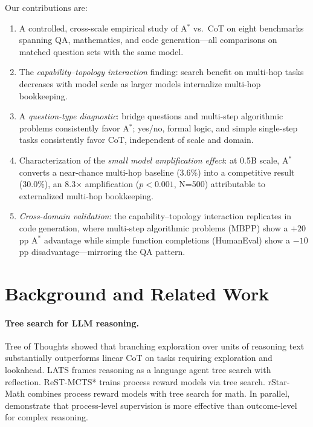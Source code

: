 \documentclass{article}
\newcommand{\astar}{A$^*$\xspace}
\begin{document}
Our contributions are:
\begin{enumerate}[leftmargin=*, noitemsep]
  \item A controlled, cross-scale empirical study of \astar vs.\ CoT on eight benchmarks spanning QA, mathematics, and code generation---all comparisons on matched question sets with the same model.
  \item The \emph{capability--topology interaction} finding: search benefit on multi-hop tasks decreases with model scale as larger models internalize multi-hop bookkeeping.
  \item A \emph{question-type diagnostic}: bridge questions and multi-step algorithmic problems consistently favor \astar; yes/no, formal logic, and simple single-step tasks consistently favor CoT, independent of scale and domain.
  \item Characterization of the \emph{small model amplification effect}: at 0.5B scale, \astar converts a near-chance multi-hop baseline (3.6\%) into a competitive result (30.0\%), an 8.3$\times$ amplification ($p<0.001$, N=500) attributable to externalized multi-hop bookkeeping.
  \item \emph{Cross-domain validation}: the capability--topology interaction replicates in code generation, where multi-step algorithmic problems (MBPP) show a $+20$\,pp \astar advantage while simple function completions (HumanEval) show a $-10$\,pp disadvantage---mirroring the QA pattern.
\end{enumerate}

\section{Background and Related Work}
\label{sec:related}

\paragraph{Tree search for LLM reasoning.}
Tree of Thoughts \citep{yao2023treethoughtsdeliberateproblem} showed that branching exploration over units of reasoning text substantially outperforms linear CoT on tasks requiring exploration and lookahead. LATS \citep{zhou2024languageagenttreesearch} frames reasoning as a language agent tree search with reflection. ReST-MCTS* \citep{zhang2024accessinggpt4levelmathematical} trains process reward models via tree search. rStar-Math \citep{guan2025rstarmathsmallllmsmaster} combines process reward models with tree search for math. In parallel, \citet{lightman2023letsverifystepstep} demonstrate that process-level supervision is more effective than outcome-level for complex reasoning.
\end{document}
